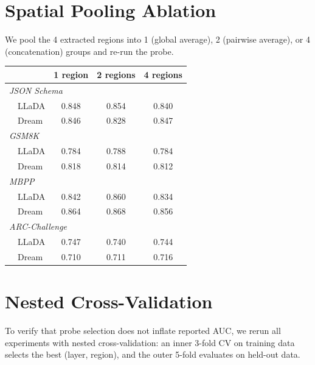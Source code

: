 \documentclass[11pt]{article}
\providecommand{\linenumbers}{}
\providecommand{\nolinenumbers}{}
\begin{document}
\section{Spatial Pooling Ablation}
\label{sec:appendix_region}

We pool the 4 extracted regions into 1 (global average), 2 (pairwise average), or 4 (concatenation) groups and re-run the probe.

\nolinenumbers
\begin{center}
  \small
  \label{tab:region_ablation}
  \begin{tabular}{lccc}
    \toprule
    & \textbf{1 region} & \textbf{2 regions} & \textbf{4 regions} \\
    \midrule
    \multicolumn{4}{l}{\textit{JSON Schema}} \\
    ~~LLaDA & 0.848 & 0.854 & 0.840 \\
    ~~Dream & 0.846 & 0.828 & 0.847 \\
    \midrule
    \multicolumn{4}{l}{\textit{GSM8K}} \\
    ~~LLaDA & 0.784 & 0.788 & 0.784 \\
    ~~Dream & 0.818 & 0.814 & 0.812 \\
    \midrule
    \multicolumn{4}{l}{\textit{MBPP}} \\
    ~~LLaDA & 0.842 & 0.860 & 0.834 \\
    ~~Dream & 0.864 & 0.868 & 0.856 \\
    \midrule
    \multicolumn{4}{l}{\textit{ARC-Challenge}} \\
    ~~LLaDA & 0.747 & 0.740 & 0.744 \\
    ~~Dream & 0.710 & 0.711 & 0.716 \\
    \bottomrule
  \end{tabular}
\end{center}
\linenumbers

\section{Nested Cross-Validation}
\label{sec:appendix_nested_cv}

To verify that probe selection does not inflate reported AUC, we rerun all experiments with nested cross-validation: an inner 3-fold CV on training data selects the best (layer, region), and the outer 5-fold evaluates on held-out data.
\end{document}
